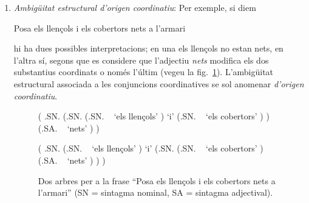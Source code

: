 \begin{enumerate}
\item \emph{Ambigüitat estructural d'origen coordinatiu}: 
Per exemple, si
  diem 
\begin{exemple}
Posa els llençols i els cobertors nets a l'armari
\end{exemple} hi
ha dues possibles interpretacions; en una els llençols no estan
nets, en l'altra sí, segons que es considere que l'adjectiu \emph{nets}
modifica els dos substantius coordinats o només l'últim (vegeu la
fig.~\ref{fg:cobertors}). L'ambigüitat estructural associada a les
conjuncions coordinatives se sol anomenar \emph{d'origen coordinatiu}.


\begin{figure}
\begin{center}
\begin{parsetree}
    ( .SN.
      (.SN.
        (.SN. ~ `els llençols' )
        `i' 
        (.SN. ~ `els cobertors' )
      )
      (.SA. ~ `nets' )
    )
\end{parsetree}
\end{center}
\begin{center}
\begin{parsetree}
    ( .SN.
        (.SN. ~ `els llençols' )
        `i' 
        (.SN. 
        (.SN. ~ `els cobertors' )
        (.SA. ~ `nets' )
        )
    )
\end{parsetree}
\end{center}

\caption{Dos arbres per a la frase ``Posa els llençols i els
  cobertors nets a l'armari'' (SN = sintagma nominal, SA = sintagma adjectival).}
\label{fg:cobertors}
\end{figure}



\end{enumerate}
